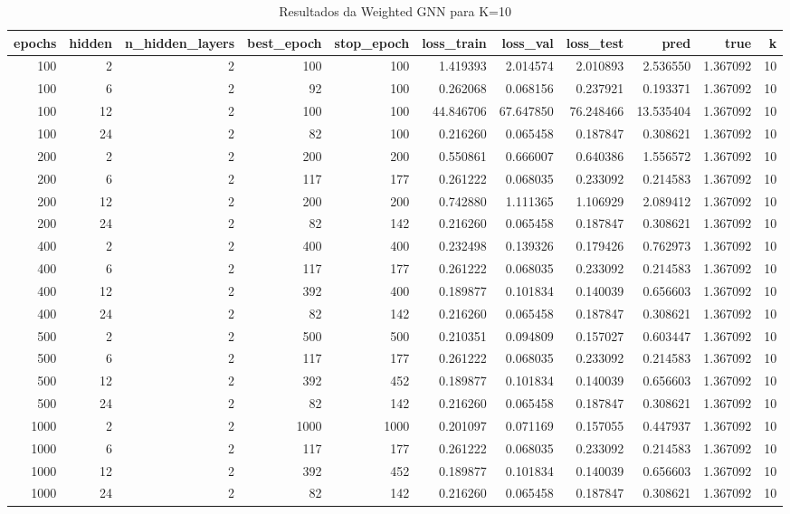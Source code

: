 \begin{table}
\caption{Resultados da Weighted GNN para K=10}
\label{tab:weighted_gnn_results_k10}
\begin{tabular}{rrrrrrrrrrr}
\toprule
epochs & hidden & n\_hidden\_layers & best\_epoch & stop\_epoch & loss\_train & loss\_val & loss\_test & pred & true & k \\
\midrule
100 & 2 & 2 & 100 & 100 & 1.419393 & 2.014574 & 2.010893 & 2.536550 & 1.367092 & 10 \\
100 & 6 & 2 & 92 & 100 & 0.262068 & 0.068156 & 0.237921 & 0.193371 & 1.367092 & 10 \\
100 & 12 & 2 & 100 & 100 & 44.846706 & 67.647850 & 76.248466 & 13.535404 & 1.367092 & 10 \\
100 & 24 & 2 & 82 & 100 & 0.216260 & 0.065458 & 0.187847 & 0.308621 & 1.367092 & 10 \\
200 & 2 & 2 & 200 & 200 & 0.550861 & 0.666007 & 0.640386 & 1.556572 & 1.367092 & 10 \\
200 & 6 & 2 & 117 & 177 & 0.261222 & 0.068035 & 0.233092 & 0.214583 & 1.367092 & 10 \\
200 & 12 & 2 & 200 & 200 & 0.742880 & 1.111365 & 1.106929 & 2.089412 & 1.367092 & 10 \\
200 & 24 & 2 & 82 & 142 & 0.216260 & 0.065458 & 0.187847 & 0.308621 & 1.367092 & 10 \\
400 & 2 & 2 & 400 & 400 & 0.232498 & 0.139326 & 0.179426 & 0.762973 & 1.367092 & 10 \\
400 & 6 & 2 & 117 & 177 & 0.261222 & 0.068035 & 0.233092 & 0.214583 & 1.367092 & 10 \\
400 & 12 & 2 & 392 & 400 & 0.189877 & 0.101834 & 0.140039 & 0.656603 & 1.367092 & 10 \\
400 & 24 & 2 & 82 & 142 & 0.216260 & 0.065458 & 0.187847 & 0.308621 & 1.367092 & 10 \\
500 & 2 & 2 & 500 & 500 & 0.210351 & 0.094809 & 0.157027 & 0.603447 & 1.367092 & 10 \\
500 & 6 & 2 & 117 & 177 & 0.261222 & 0.068035 & 0.233092 & 0.214583 & 1.367092 & 10 \\
500 & 12 & 2 & 392 & 452 & 0.189877 & 0.101834 & 0.140039 & 0.656603 & 1.367092 & 10 \\
500 & 24 & 2 & 82 & 142 & 0.216260 & 0.065458 & 0.187847 & 0.308621 & 1.367092 & 10 \\
1000 & 2 & 2 & 1000 & 1000 & 0.201097 & 0.071169 & 0.157055 & 0.447937 & 1.367092 & 10 \\
1000 & 6 & 2 & 117 & 177 & 0.261222 & 0.068035 & 0.233092 & 0.214583 & 1.367092 & 10 \\
1000 & 12 & 2 & 392 & 452 & 0.189877 & 0.101834 & 0.140039 & 0.656603 & 1.367092 & 10 \\
1000 & 24 & 2 & 82 & 142 & 0.216260 & 0.065458 & 0.187847 & 0.308621 & 1.367092 & 10 \\
\bottomrule
\end{tabular}
\end{table}
